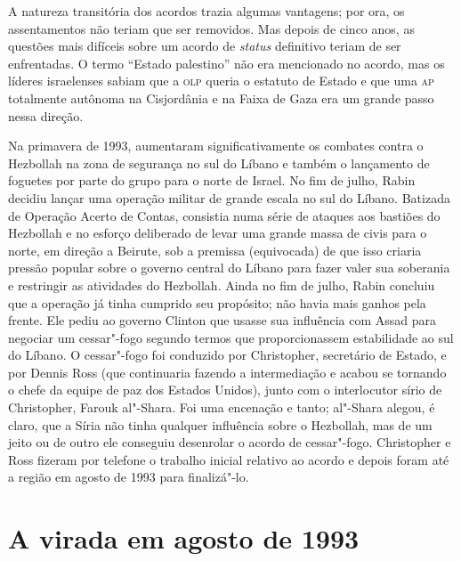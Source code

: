 A natureza transitória dos acordos trazia algumas vantagens; por ora, os
assentamentos não teriam que ser removidos. Mas depois de cinco anos, as
questões mais difíceis sobre um acordo de \textit{status} definitivo teriam de
ser enfrentadas. O termo ``Estado palestino'' não era mencionado no
acordo, mas os líderes israelenses sabiam que a \textsc{olp} queria o estatuto de
Estado e que uma \textsc{ap} totalmente autônoma na Cisjordânia e na Faixa de
Gaza era um grande passo nessa direção.

Na primavera de 1993, aumentaram significativamente os combates contra o
Hezbollah na zona de segurança no sul do Líbano e também o lançamento de
foguetes por parte do grupo para o norte de Israel. No fim de julho,
Rabin decidiu lançar uma operação militar de grande escala no sul do
Líbano. Batizada de Operação Acerto de Contas, consistia numa série de
ataques aos bastiões do Hezbollah e no esforço deliberado de levar uma
grande massa de civis para o norte, em direção a Beirute, sob a premissa
(equivocada) de que isso criaria pressão popular sobre o governo central
do Líbano para fazer valer sua soberania e restringir as atividades do
Hezbollah. Ainda no fim de julho, Rabin concluiu que a operação já tinha
cumprido seu propósito; não havia mais ganhos pela frente. Ele pediu ao
governo Clinton que usasse sua influência com Assad para negociar um
cessar"-fogo segundo termos que proporcionassem estabilidade ao sul do
Líbano. O cessar"-fogo foi conduzido por Christopher, secretário de
Estado, e por Dennis Ross (que continuaria fazendo a intermediação e
acabou se tornando o chefe da equipe de paz dos Estados Unidos), junto
com o interlocutor sírio de Christopher, Farouk al"-Shara. Foi uma
encenação e tanto; al"-Shara alegou, é claro, que a Síria não tinha
qualquer influência sobre o Hezbollah, mas de um jeito ou de outro ele
conseguiu desenrolar o acordo de cessar"-fogo. Christopher e Ross fizeram
por telefone o trabalho inicial relativo ao acordo e depois foram até a
região em agosto de 1993 para finalizá"-lo.

\section{A virada em agosto de 1993}

